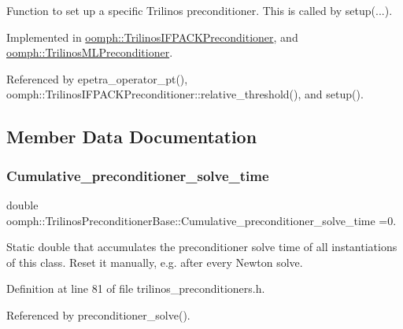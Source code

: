 Function to set up a specific Trilinos preconditioner. This is called by setup(...). 



Implemented in \hyperlink{classoomph_1_1TrilinosIFPACKPreconditioner_a947df99c1dd6afa6a3149d045f9452a4}{oomph\+::\+Trilinos\+I\+F\+P\+A\+C\+K\+Preconditioner}, and \hyperlink{classoomph_1_1TrilinosMLPreconditioner_af3042313db1f0a5565bcd33ef36d2c6a}{oomph\+::\+Trilinos\+M\+L\+Preconditioner}.



Referenced by epetra\+\_\+operator\+\_\+pt(), oomph\+::\+Trilinos\+I\+F\+P\+A\+C\+K\+Preconditioner\+::relative\+\_\+threshold(), and setup().



\subsection{Member Data Documentation}
\mbox{\label{classoomph_1_1TrilinosPreconditionerBase_a6fefea3562e20d9b446dbe72ce88d506}} 
\subsubsection{\texorpdfstring{Cumulative\+\_\+preconditioner\+\_\+solve\+\_\+time}{Cumulative\_preconditioner\_solve\_time}}
{\footnotesize\ttfamily double oomph\+::\+Trilinos\+Preconditioner\+Base\+::\+Cumulative\+\_\+preconditioner\+\_\+solve\+\_\+time =0.\hspace{0.3cm}{\ttfamily [static]}}



Static double that accumulates the preconditioner solve time of all instantiations of this class. Reset it manually, e.\+g. after every Newton solve. 



Definition at line 81 of file trilinos\+\_\+preconditioners.\+h.



Referenced by preconditioner\+\_\+solve().

\mbox{\label{classoomph_1_1TrilinosPreconditionerBase_a515a6df2a535337d520cfe98bdcd38f4}} 
